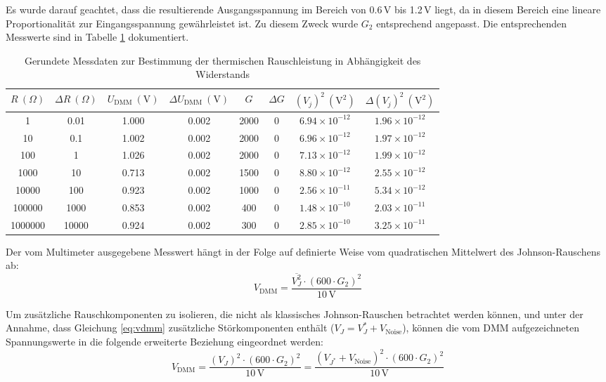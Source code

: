 \documentclass{article}
\begin{document}
Es wurde darauf geachtet, dass die resultierende Ausgangsspannung im Bereich von 0.6\,V bis 1.2\,V liegt, da in diesem Bereich eine lineare Proportionalität zur Eingangsspannung gewährleistet ist. Zu diesem Zweck wurde $G_2$ entsprechend angepasst.
Die entsprechenden Messwerte sind in Tabelle \ref{tab:johnson messdaten widerstand} dokumentiert.
\begin{table}[h!]
\centering
\begin{tabular}{|c|c|c|c|c|c|c|c|}
\hline
$R\ (\Omega)$ & $\Delta R\ (\Omega)$ & $U_{\mathrm{DMM}}\ (\mathrm{V})$ & $\Delta U_{\mathrm{DMM}}\ (\mathrm{V})$ & $G$ & $\Delta G$ & $(V_j)^2\ (\mathrm{V}^2)$ & $\Delta (V_j)^2\ (\mathrm{V}^2)$ \\
\hline
1       & 0.01     & 1.000 & 0.002 & 2000 & 0 & $6.94 \times 10^{-12}$  & $1.96 \times 10^{-12}$ \\
10      & 0.1      & 1.002 & 0.002 & 2000 & 0 & $6.96 \times 10^{-12}$  & $1.97 \times 10^{-12}$ \\
100     & 1        & 1.026 & 0.002 & 2000 & 0 & $7.13 \times 10^{-12}$  & $1.99 \times 10^{-12}$ \\
1000    & 10       & 0.713 & 0.002 & 1500 & 0 & $8.80 \times 10^{-12}$  & $2.55 \times 10^{-12}$ \\
10000   & 100      & 0.923 & 0.002 & 1000 & 0 & $2.56 \times 10^{-11}$  & $5.34 \times 10^{-12}$ \\
100000  & 1000     & 0.853 & 0.002 & 400  & 0 & $1.48 \times 10^{-10}$  & $2.03 \times 10^{-11}$ \\
1000000 & 10000    & 0.924 & 0.002 & 300  & 0 & $2.85 \times 10^{-10}$  & $3.25 \times 10^{-11}$ \\
\hline
\end{tabular}
\caption{Gerundete Messdaten zur Bestimmung der thermischen Rauschleistung in Abhängigkeit des Widerstands}
\label{tab:johnson messdaten widerstand}
\end{table}

Der vom Multimeter ausgegebene Messwert hängt in der Folge auf definierte Weise vom quadratischen Mittelwert des Johnson-Rauschens ab:
\begin{equation}
V_{\mathrm{DMM}} = \frac{\overline{V_J^2} \cdot (600 \cdot G_2)^2}{10\,\mathrm{V}}
\label{eq:vdmm}
\end{equation}

Um zusätzliche Rauschkomponenten zu isolieren, die nicht als klassisches Johnson-Rauschen betrachtet werden können, und unter der Annahme, dass Gleichung \ref{eq:vdmm} zusätzliche Störkomponenten enthält ($V_J = V_J^* + V_{\text{Noise}}$), können die vom DMM aufgezeichneten Spannungswerte in die folgende erweiterte Beziehung eingeordnet werden:
\begin{equation}
V_{\mathrm{DMM}} = \frac{(V_J)^2 \cdot (600 \cdot G_2)^2}{10\,\mathrm{V}} = \frac{(V_{J^*} + V_{\mathrm{Noise}})^2 \cdot (600 \cdot G_2)^2}{10\,\mathrm{V}}
\end{equation}
\end{document}

